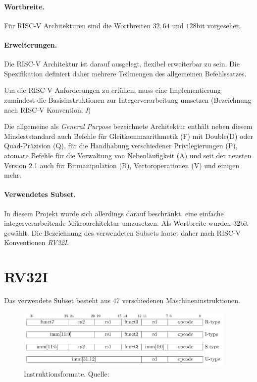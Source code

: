 \paragraph{Wortbreite.} Für RISC-V Architekturen sind die Wortbreiten $32, 64$ und $128$bit vorgesehen.

\paragraph{Erweiterungen.} Die RISC-V Architektur ist darauf ausgelegt, flexibel erweiterbar zu sein. Die Spezifikation definiert daher mehrere Teilmengen des allgemeinen Befehlssatzes. \citep[p. 4]{RISC}

Um die RISC-V Anforderungen zu erfüllen, muss eine Implementierung zumindest die Basisinstruktionen zur Integerverarbeitung umsetzen (Bezeichnung nach RISC-V Konvention: \textit{I})

Die allgemeine als \textit{General Purpose} bezeichnete Architektur enthält neben diesem Mindeststandard auch Befehle für Gleitkommaarithmetik (F) mit Double(D) oder Quad-Präzision (Q), für die Handhabung verschiedener Privilegierungen (P), atomare Befehle für die Verwaltung von Nebenläufigkeit (A) und seit der neusten Version 2.1 auch für Bitmanipulation (B), Vectoroperationen (V) und einigen mehr.

\paragraph{Verwendetes Subset.} In diesem Projekt wurde sich allerdings darauf beschränkt, eine einfache integerverarbeitende Mikroarchitektur umzusetzen. Als Wortbreite wurden 32bit gewählt. Die Bezeichnung des verwendeten Subsets lautet daher nach RISC-V Konventionen \textit{RV32I}.

\section{RV32I}
Das verwendete Subset besteht aus $47$ verschiedenen Maschineninstruktionen.

\begin{figure} [ht]
  \centering
  \includegraphics[width=0.95\textwidth]{Figures/instruction_formats}
  \caption{Instruktionsformate. Quelle: \citep[p. 11]{RISC}}
  \label{fig:instr_types}
\end{figure}

